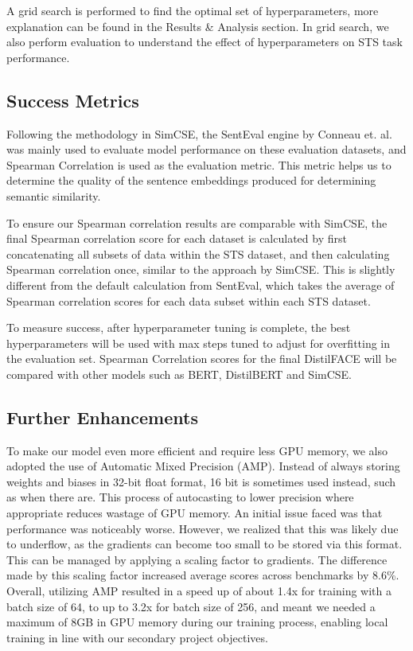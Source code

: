 \documentclass[10pt,twocolumn,letterpaper]{article}
\begin{document}
A grid search is performed to find the optimal set of hyperparameters, more explanation can be found in the Results \& Analysis section. In grid search, we also perform evaluation to understand the effect of hyperparameters on STS task performance.

\subsection{Success Metrics}

Following the methodology in SimCSE, the SentEval engine by Conneau et. al. \cite{1803.05449} was mainly used to evaluate model performance on these evaluation datasets, and Spearman Correlation is used as the evaluation metric. This metric helps us to determine the quality of the sentence embeddings produced for determining semantic similarity.

To ensure our Spearman correlation results are comparable with SimCSE, the final Spearman correlation score for each dataset is calculated by first concatenating all subsets of data within the STS dataset, and then calculating Spearman correlation once, similar to the approach by SimCSE. This is slightly different from the default calculation from SentEval, which takes the average of Spearman correlation scores for each data subset within each STS dataset.

To measure success, after hyperparameter tuning is complete, the best hyperparameters will be used with max steps tuned to adjust for overfitting in the evaluation set. Spearman Correlation scores for the final DistilFACE will be compared with other models such as BERT, DistilBERT and SimCSE. 

\subsection{Further Enhancements}

To make our model even more efficient and require less GPU memory, we also adopted the use of Automatic Mixed Precision (AMP). Instead of always storing weights and biases in 32-bit float format, 16 bit is sometimes used instead, such as when there are. This process of autocasting to lower precision where appropriate reduces wastage of GPU memory. An initial issue faced was that performance was noticeably worse. However, we realized that this was likely due to underflow, as the gradients can become too small to be stored via this format. This can be managed by applying a scaling factor to gradients. The difference made by this scaling factor increased average scores across benchmarks by 8.6\%. Overall, utilizing AMP resulted in a speed up of about 1.4x for training with a batch size of 64, to up to 3.2x for batch size of 256, and meant we needed a maximum of 8GB in GPU memory during our training process, enabling local training in line with our secondary project objectives.
\end{document}
